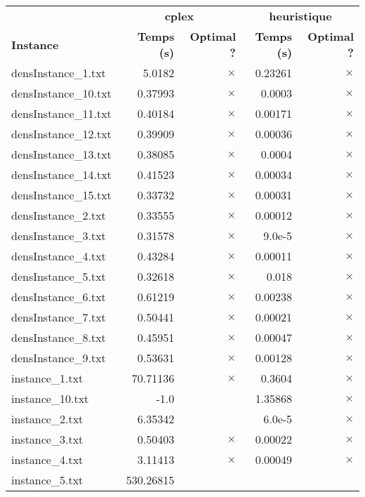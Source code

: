 \documentclass{article}
\begin{document}
\begin{center}
\renewcommand{\arraystretch}{1.4} 
 \begin{tabular}{lrrrr}
	\hline
 & \multicolumn{2}{c}{\textbf{cplex}} & \multicolumn{2}{c}{\textbf{heuristique}}\\
\textbf{Instance}  & \textbf{Temps (s)} & \textbf{Optimal ?}  & \textbf{Temps (s)} & \textbf{Optimal ?} \\\hline

densInstance\_1.txt & 5.0182 & 
$\times$
 & 0.23261 & 
$\times$
\\
densInstance\_10.txt & 0.37993 & 
$\times$
 & 0.0003 & 
$\times$
\\
densInstance\_11.txt & 0.40184 & 
$\times$
 & 0.00171 & 
$\times$
\\
densInstance\_12.txt & 0.39909 & 
$\times$
 & 0.00036 & 
$\times$
\\
densInstance\_13.txt & 0.38085 & 
$\times$
 & 0.0004 & 
$\times$
\\
densInstance\_14.txt & 0.41523 & 
$\times$
 & 0.00034 & 
$\times$
\\
densInstance\_15.txt & 0.33732 & 
$\times$
 & 0.00031 & 
$\times$
\\
densInstance\_2.txt & 0.33555 & 
$\times$
 & 0.00012 & 
$\times$
\\
densInstance\_3.txt & 0.31578 & 
$\times$
 & 9.0e-5 & 
$\times$
\\
densInstance\_4.txt & 0.43284 & 
$\times$
 & 0.00011 & 
$\times$
\\
densInstance\_5.txt & 0.32618 & 
$\times$
 & 0.018 & 
$\times$
\\
densInstance\_6.txt & 0.61219 & 
$\times$
 & 0.00238 & 
$\times$
\\
densInstance\_7.txt & 0.50441 & 
$\times$
 & 0.00021 & 
$\times$
\\
densInstance\_8.txt & 0.45951 & 
$\times$
 & 0.00047 & 
$\times$
\\
densInstance\_9.txt & 0.53631 & 
$\times$
 & 0.00128 & 
$\times$
\\
instance\_1.txt & 70.71136 & 
$\times$
 & 0.3604 & 
$\times$
\\
instance\_10.txt & -1.0 & 
 & 1.35868 & 
$\times$
\\
instance\_2.txt & 6.35342 & 
 & 6.0e-5 & 
$\times$
\\
instance\_3.txt & 0.50403 & 
$\times$
 & 0.00022 & 
$\times$
\\
instance\_4.txt & 3.11413 & 
$\times$
 & 0.00049 & 
$\times$
\\
instance\_5.txt & 530.26815 & 

\end{tabular}
\end{center}
\end{document}
